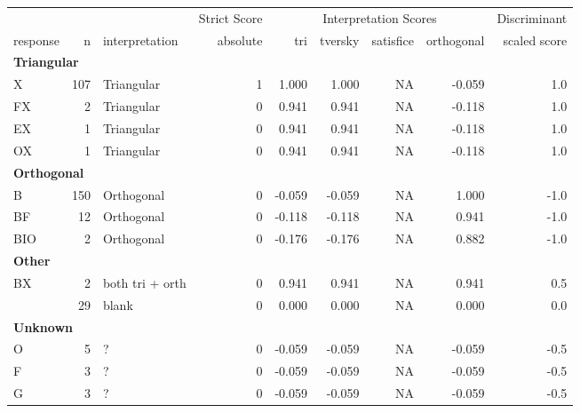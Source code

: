 \documentclass[
  letterpaper,
  DIV=11,
  numbers=noendperiod]{scrreprt}
\begin{document}
\begin{tabular}[t]{l|r|l|r|r|r|r|r|r}
\hline
\multicolumn{3}{c|}{ } & \multicolumn{1}{c|}{Strict Score} & \multicolumn{4}{c|}{Interpretation Scores} & \multicolumn{1}{c}{Discriminant} \\
\cline{4-4} \cline{5-8} \cline{9-9}
response & n & interpretation & absolute & tri & tversky & satisfice & orthogonal & scaled score\\
\hline
\multicolumn{9}{l}{\textbf{Triangular}}\\
\hline
\hspace{1em}X & 107 & Triangular & 1 & 1.000 & 1.000 & NA & -0.059 & 1.0\\
\hline
\hspace{1em}FX & 2 & Triangular & 0 & 0.941 & 0.941 & NA & -0.118 & 1.0\\
\hline
\hspace{1em}EX & 1 & Triangular & 0 & 0.941 & 0.941 & NA & -0.118 & 1.0\\
\hline
\hspace{1em}OX & 1 & Triangular & 0 & 0.941 & 0.941 & NA & -0.118 & 1.0\\
\hline
\multicolumn{9}{l}{\textbf{Orthogonal}}\\
\hline
\hspace{1em}B & 150 & Orthogonal & 0 & -0.059 & -0.059 & NA & 1.000 & -1.0\\
\hline
\hspace{1em}BF & 12 & Orthogonal & 0 & -0.118 & -0.118 & NA & 0.941 & -1.0\\
\hline
\hspace{1em}BIO & 2 & Orthogonal & 0 & -0.176 & -0.176 & NA & 0.882 & -1.0\\
\hline
\multicolumn{9}{l}{\textbf{Other}}\\
\hline
\hspace{1em}BX & 2 & both tri + orth & 0 & 0.941 & 0.941 & NA & 0.941 & 0.5\\
\hline
\hspace{1em} & 29 & blank & 0 & 0.000 & 0.000 & NA & 0.000 & 0.0\\
\hline
\multicolumn{9}{l}{\textbf{Unknown}}\\
\hline
\hspace{1em}O & 5 & ? & 0 & -0.059 & -0.059 & NA & -0.059 & -0.5\\
\hline
\hspace{1em}F & 3 & ? & 0 & -0.059 & -0.059 & NA & -0.059 & -0.5\\
\hline
\hspace{1em}G & 3 & ? & 0 & -0.059 & -0.059 & NA & -0.059 & -0.5\\

\end{tabular}
\end{document}
